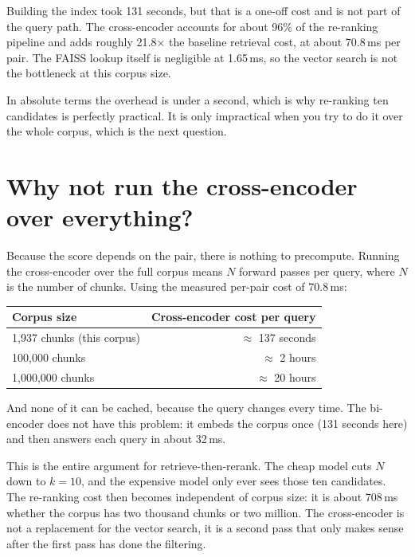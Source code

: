 \documentclass[11pt,a4paper]{article}
\begin{document}
Building the index took 131 seconds, but that is a one-off cost and is not part of the query
path. The cross-encoder accounts for about 96\% of the re-ranking pipeline and adds roughly
21.8$\times$ the baseline retrieval cost, at about 70.8\,ms per pair. The FAISS lookup itself is
negligible at 1.65\,ms, so the vector search is not the bottleneck at this corpus size.

In absolute terms the overhead is under a second, which is why re-ranking ten candidates is
perfectly practical. It is only impractical when you try to do it over the whole corpus, which
is the next question.

\section{Why not run the cross-encoder over everything?}

Because the score depends on the pair, there is nothing to precompute. Running the cross-encoder
over the full corpus means $N$ forward passes per query, where $N$ is the number of chunks.
Using the measured per-pair cost of 70.8\,ms:

\begin{center}
\small
\begin{tabular}{@{}lr@{}}
\toprule
\textbf{Corpus size} & \textbf{Cross-encoder cost per query} \\
\midrule
1{,}937 chunks (this corpus) & $\approx$ 137 seconds \\
100{,}000 chunks             & $\approx$ 2 hours \\
1{,}000{,}000 chunks         & $\approx$ 20 hours \\
\bottomrule
\end{tabular}
\end{center}

And none of it can be cached, because the query changes every time. The bi-encoder does not have
this problem: it embeds the corpus once (131 seconds here) and then answers each query in about
32\,ms.

This is the entire argument for retrieve-then-rerank. The cheap model cuts $N$ down to $k = 10$,
and the expensive model only ever sees those ten candidates. The re-ranking cost then becomes
independent of corpus size: it is about 708\,ms whether the corpus has two thousand chunks or
two million. The cross-encoder is not a replacement for the vector search, it is a second pass
that only makes sense after the first pass has done the filtering.
\end{document}
